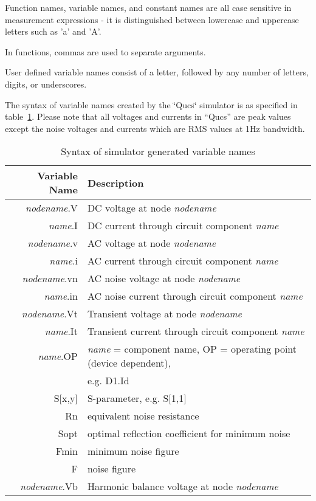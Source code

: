 
Function names, variable names, and constant names are all case sensitive
in measurement expressions - it is distinguished between lowercase
and uppercase letters such as 'a' and 'A'.

In functions, commas are used to separate arguments.



User defined variable names consist of a letter, followed by any number
of letters, digits, or underscores.

The syntax of variable names created by the \char`\"{}Qucs\char`\"{}
simulator is as specified in table~\ref{table:var_names}.  Please note
that all voltages and currents in {}``Qucs'' are peak values except
the noise voltages and currents which are RMS values at 1Hz bandwidth.

%
\begin{table}[ht]
\begin{flushleft}\begin{tabular}{|r|l|}
\hline 
Variable Name&
Description\tabularnewline
\hline
\hline 
\textit{nodename}.V&
DC voltage at node \textit{nodename}\tabularnewline
\hline 
\textit{name}.I&
DC current through circuit component \textit{name}\tabularnewline
\hline 
\textit{nodename}.v&
AC voltage at node \textit{nodename}\tabularnewline
\hline 
\textit{name}.i&
AC current through circuit component \textit{name}\tabularnewline
\hline 
\textit{nodename}.vn&
AC noise voltage at node \textit{nodename}\tabularnewline
\hline 
\textit{name}.in&
AC noise current through circuit component \textit{name}\tabularnewline
\hline 
\textit{nodename}.Vt&
Transient voltage at node \textit{nodename}\tabularnewline
\hline 
\textit{name}.It&
Transient current through circuit component \textit{name}\tabularnewline
\hline
\textit{name}.OP&
\textit{name} = component name, OP = operating point (device dependent),\tabularnewline
&
 e.g. D1.Id\tabularnewline
\hline
S{[}x,y{]}&
S-parameter, e.g. S{[}1,1{]}\tabularnewline
\hline
Rn&
equivalent noise resistance\tabularnewline
\hline
Sopt&
optimal reflection coefficient for minimum noise\tabularnewline
\hline
Fmin&
minimum noise figure\tabularnewline
\hline
F &
noise figure\tabularnewline
\hline
\textit{nodename}.Vb&
Harmonic balance voltage at node \textit{nodename}\tabularnewline
\hline 
\end{tabular}\end{flushleft}


\caption{\label{table:var_names}Syntax of simulator generated variable names}
\end{table}



